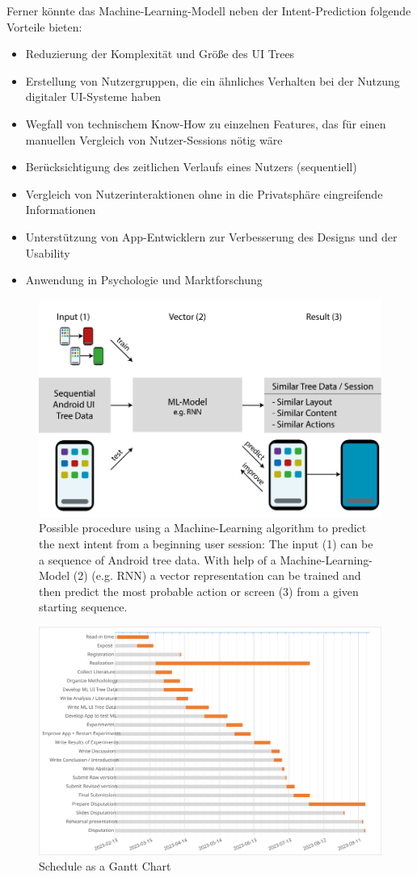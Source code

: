 Ferner könnte das Machine-Learning-Modell neben der Intent-Prediction folgende Vorteile bieten:
\begin{itemize}
  \item Reduzierung der Komplexität und Größe des UI Trees
  \item Erstellung von Nutzergruppen, die ein ähnliches Verhalten bei der Nutzung digitaler UI-Systeme haben
  \item Wegfall von technischem Know-How zu einzelnen Features, das für einen manuellen Vergleich von Nutzer-Sessions nötig wäre \cite{ghods2019activity2vec}
  \item Berücksichtigung des zeitlichen Verlaufs eines Nutzers (sequentiell)
  \item Vergleich von Nutzerinteraktionen ohne in die Privatsphäre eingreifende Informationen
  \item Unterstützung von App-Entwicklern zur Verbesserung des Designs und der Usability
  \item Anwendung in Psychologie und Marktforschung
\end{itemize}

\begin{figure}
  \centering
  \includegraphics[width=\textwidth]{graphics/vectorization.svg}
  \caption{Possible procedure using a Machine-Learning algorithm to predict the next intent from a beginning user session: The input (1) can be a sequence of Android tree data. With help of a Machine-Learning-Model (2) (e.g. RNN) a vector representation can be trained and then predict the most probable action or screen (3) from a given starting sequence.}
  \label{fig:encode-decode}
\end{figure}

\begin{figure}
  \centering
  \includegraphics[width=\textwidth]{graphics/TimeTable-Gantt.svg}
  \caption{Schedule as a Gantt Chart}
  \label{fig:schedule}
\end{figure}
